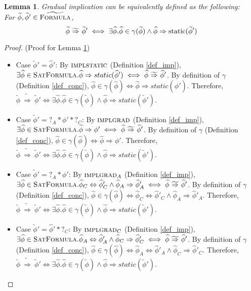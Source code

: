 \documentclass {article}
\newtheorem{lemma}[theorem]{Lemma}
\newcommand{\fphi}{\widehat{\phi}}
\newcommand{\tphi}{\widetilde{\phi}}
\newcommand{\imp}{\Rightarrow}
\newcommand{\timp}{\ \widetilde{\Rightarrow}\ }
\newcommand{\static}[1]{\textup{static}(#1)}
\newcommand{\satdef}{\textsc{SatFormula}}
\newcommand{\gradformula}{\widetilde{\textsc{Formula}}}
\begin{document}
\begin{lemma}
\label{lemma_impl_equiv}
Gradual implication can be equivalently defined as the following:\\ For $\tphi, \tphi' \in \gradformula$, $$\tphi \timp \tphi' \iff \exists \fphi. \fphi \in \gamma(\tphi) \wedge \fphi \imp \static{\tphi'}$$
\end{lemma}
\begin{proof}(Proof for Lemma \ref{lemma_impl_equiv})\\
\begin{itemize}
    \item Case $\tphi' = \fphi'$: By $\textsc{implstatic}$ (Definition \ref{def_imp}), $\exists \fphi \in \satdef.\fphi \imp static(\fphi') \iff \fphi \timp \fphi'$. By definition of $\gamma$ (Definition \ref{def_conc}), $\fphi \in \gamma(\fphi) \iff \fphi \imp static(\fphi')$. Therefore, $\tphi \timp \tphi' \iff \exists \fphi. \fphi \in \gamma(\tphi) \wedge \fphi \imp static(\tphi')$.

    \item Case $\tphi' = ?_A \ast \phi' \ast ?_C$: By $\textsc{implgrad}$ (Definition \ref{def_imp}), $\exists \fphi \in \satdef.\fphi\Rightarrow \phi' \iff \fphi \timp \fphi'$. By definition of $\gamma$ (Definition \ref{def_conc}), $\fphi \in \gamma(\fphi) \iff \fphi\Rightarrow \phi'$. Therefore, $\tphi \timp \tphi' \iff \exists \fphi. \fphi \in \gamma(\tphi) \wedge \fphi \imp static(\tphi')$.


    \item Case $\tphi' = ?_A \ast \phi'$: By $\textsc{implgrad}_A$ (Definition \ref{def_imp}), $\exists \fphi \in \satdef.\fphi_C \Leftrightarrow \fphi'_C \wedge \fphi_A \Rightarrow \fphi'_A \iff \fphi \timp \fphi'$. By definition of $\gamma$ (Definition \ref{def_conc}), $\fphi \in \gamma(\fphi) \iff \fphi_C \Leftrightarrow \fphi'_C \wedge \fphi_A \Rightarrow \fphi'_A$. Therefore, $\tphi \timp \tphi' \iff \exists \fphi. \fphi \in \gamma(\tphi) \wedge \fphi \imp static(\tphi')$.

    \item Case $\tphi' = \fphi' \ast ?_C$: By $\textsc{implgrad}_C$ (Definition \ref{def_imp}), $\exists \fphi \in \satdef.\fphi_A \Leftrightarrow \fphi'_A \wedge \fphi_C \Rightarrow \fphi'_C \iff \fphi \timp \fphi'$. By definition of $\gamma$ (Definition \ref{def_conc}), $\fphi \in \gamma(\fphi) \iff \fphi_A \Leftrightarrow \fphi'_A \wedge \fphi_C \Rightarrow \fphi'_C$. Therefore, $\tphi \timp \tphi' \iff \exists \fphi. \fphi \in \gamma(\tphi) \wedge \fphi \imp static(\tphi')$.



\end{itemize}
\end{proof}
\end{document}
